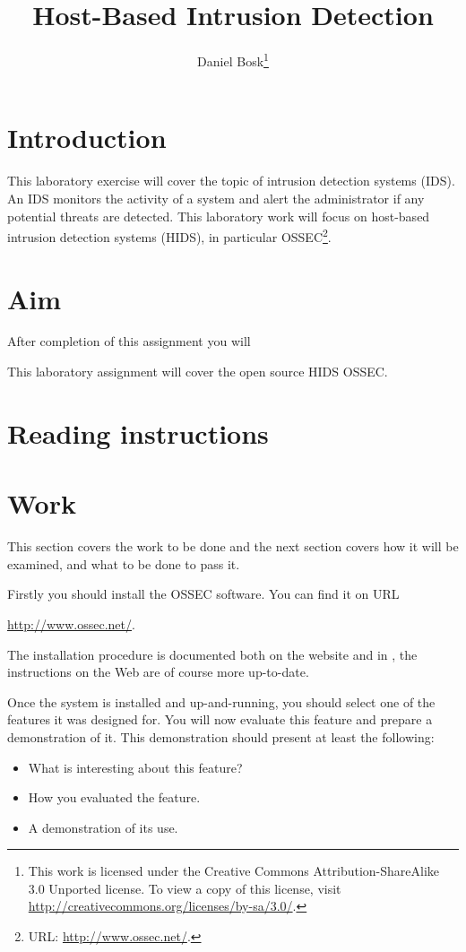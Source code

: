 \documentclass[a4paper,nocourse]{miunasgn}
\title{Host-Based Intrusion Detection}
\author{Daniel Bosk\footnote{%
  This work is licensed under the Creative Commons Attribution-ShareAlike 3.0 
  Unported license.
	To view a copy of this license, visit 
	\url{http://creativecommons.org/licenses/by-sa/3.0/}.
}}
\date{\svnId}
\begin{document}
\maketitle
\thispagestyle{foot}
\tableofcontents

\section{Introduction}
\label{sec:intro}
This laboratory exercise will cover the topic of intrusion detection
systems (IDS).
An IDS monitors the activity of a system and alert the administrator if any 
potential threats are detected.
This laboratory work will focus on host-based intrusion detection systems 
(HIDS), in particular OSSEC\footnote{%
  URL: \url{http://www.ossec.net/}.
}.


\section{Aim}
\label{sec:aim}
After completion of this assignment you will
\begin{itemize}
    
\end{itemize}

This laboratory assignment will cover the open source HIDS OSSEC.


\section{Reading instructions}
\label{sec:reading}



\section{Work}
\label{sec:tasks}
This section covers the work to be done and the next section covers how it will 
be examined, and what to be done to pass it.

Firstly you should install the OSSEC software.
You can find it on URL
\begin{center}
  \url{http://www.ossec.net/}.
\end{center}
The installation procedure is documented both on the website and in 
\cite{ossec2}, the instructions on the Web are of course more up-to-date.

Once the system is installed and up-and-running, you should select one of the 
features it was designed for.
You will now evaluate this feature and prepare a demonstration of it.
This demonstration should present at least the following:
\begin{itemize}
  \item What is interesting about this feature?
  \item How you evaluated the feature.
  \item A demonstration of its use.
\end{itemize}
\end{document}
